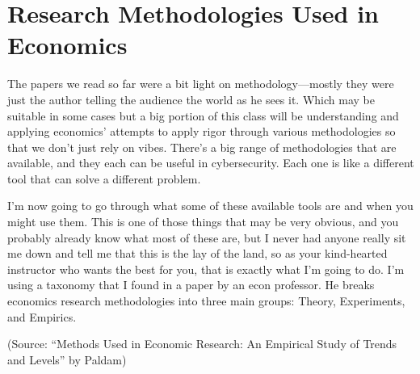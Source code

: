 \documentclass[11pt]{article}
\begin{document}
\section{Research Methodologies Used in Economics}

The papers we read so far were a bit light on methodology---mostly they were just the author telling the audience the world as he sees it. Which may be suitable in some cases but a big portion of this class will be understanding and applying economics' attempts to apply rigor through various methodologies so that we don't just rely on vibes. 
There's a big range of methodologies that are available, and they each can be useful in cybersecurity. 
Each one is like a different tool that can solve a different problem.

I'm now going to go through what some of these available tools are and when you might use them.
This is one of those things that may be very obvious, and you probably already know what most of these are, but I never had anyone really sit me down and tell me that this is the lay of the land, so as your kind-hearted instructor who wants the best for you, that is exactly what I'm going to do. I'm using a taxonomy that I found in a paper by an econ professor. He breaks economics research methodologies into three main groups: Theory, Experiments, and Empirics.

(Source: ``Methods Used in Economic Research: An Empirical Study of Trends and Levels'' by Paldam)
\end{document}
